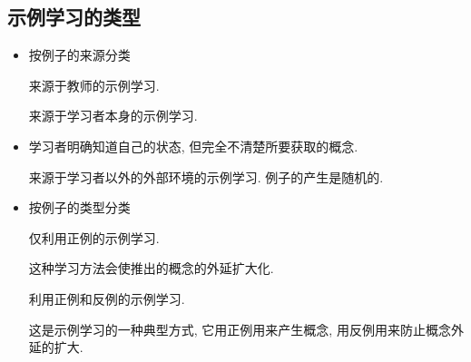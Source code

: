 \subsection{示例学习的类型}
\begin{itemize}
\item 按例子的来源分类

   来源于教师的示例学习.

   来源于学习者本身的示例学习.
\item 学习者明确知道自己的状态, 但完全不清楚所要获取的概念.

     来源于学习者以外的外部环境的示例学习. 例子的产生是随机的.
\item 按例子的类型分类

     仅利用正例的示例学习.

    这种学习方法会使推出的概念的外延扩大化.

     利用正例和反例的示例学习.

    这是示例学习的一种典型方式, 它用正例用来产生概念, 用反例用来防止概念外延的扩大.
\end{itemize}
